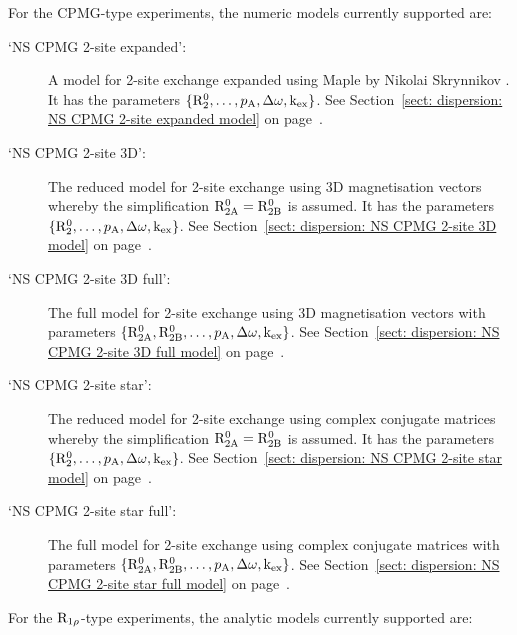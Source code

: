 For the CPMG-type experiments, the numeric models currently supported are:

\begin{description}
\item[`NS CPMG 2-site expanded':]  A model for 2-site exchange expanded using Maple by Nikolai Skrynnikov \citep{Tollinger01}.  It has the parameters $\{\mathrm{R}_2^0, \dots, p_\textrm{A}, \Delta\omega, \textrm{k}_\textrm{ex}\}$.  See Section~\ref{sect: dispersion: NS CPMG 2-site expanded model} on page~\pageref{sect: dispersion: NS CPMG 2-site expanded model}.
\item[`NS CPMG 2-site 3D':]  The reduced model for 2-site exchange using 3D magnetisation vectors whereby the simplification $\mathrm{R}_\mathrm{2A}^0 = \mathrm{R}_\mathrm{2B}^0$ is assumed.  It has the parameters $\{\mathrm{R}_2^0, \dots, p_\textrm{A}, \Delta\omega, \textrm{k}_\textrm{ex}\}$.  See Section~\ref{sect: dispersion: NS CPMG 2-site 3D model} on page~\pageref{sect: dispersion: NS CPMG 2-site 3D model}.
\item[`NS CPMG 2-site 3D full':]  The full model for 2-site exchange using 3D magnetisation vectors with parameters $\{\mathrm{R}_\mathrm{2A}^0, \mathrm{R}_\mathrm{2B}^0, \dots, p_\textrm{A}, \Delta\omega, \textrm{k}_\textrm{ex}\}$.  See Section~\ref{sect: dispersion: NS CPMG 2-site 3D full model} on page~\pageref{sect: dispersion: NS CPMG 2-site 3D full model}.
\item[`NS CPMG 2-site star':]  The reduced model for 2-site exchange using complex conjugate matrices whereby the simplification $\mathrm{R}_\mathrm{2A}^0 = \mathrm{R}_\mathrm{2B}^0$ is assumed.  It has the parameters $\{\mathrm{R}_2^0, \dots, p_\textrm{A}, \Delta\omega, \textrm{k}_\textrm{ex}\}$.  See Section~\ref{sect: dispersion: NS CPMG 2-site star model} on page~\pageref{sect: dispersion: NS CPMG 2-site star model}.
\item[`NS CPMG 2-site star full':]  The full model for 2-site exchange using complex conjugate matrices with parameters $\{\mathrm{R}_\mathrm{2A}^0, \mathrm{R}_\mathrm{2B}^0, \dots, p_\textrm{A}, \Delta\omega, \textrm{k}_\textrm{ex}\}$.  See Section~\ref{sect: dispersion: NS CPMG 2-site star full model} on page~\pageref{sect: dispersion: NS CPMG 2-site star full model}.
\end{description}


For the $\mathrm{R}_{1\rho}$-type experiments, the analytic models currently supported are:

